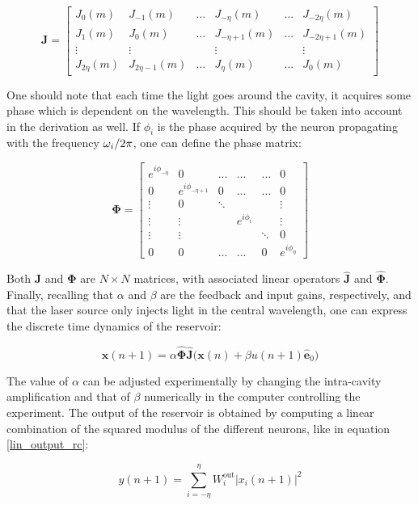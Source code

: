 \begin{equation}
	\mathbf{J} = \begin{bmatrix}
		J_0(m) & J_{-1}(m) & \dots & J_{-\eta}(m) & \dots & J_{-2\eta}(m) \\
		J_1(m) & J_0(m) & \dots & J_{-\eta+1}(m) & \dots & J_{-2\eta+1}(m) \\
		\vdots & \vdots &  & \vdots &  & \vdots \\
		J_{2\eta}(m) & J_{2\eta-1}(m) & \dots & J_\eta(m) & \dots & J_0(m)
	\end{bmatrix}
\end{equation}

One should note that each time the light goes around the cavity, it acquires some phase which is dependent on the wavelength. This should be taken into account in the derivation as well. If $\phi_i$ is the phase acquired by the neuron propagating with the frequency $\omega_i/2\pi$, one can define the phase matrix:

\begin{equation}
	\mathbf{\Phi} = \begin{bmatrix}
		e^{i\phi_{-\eta}} & 0 & \dots & \dots & \dots & 0 \\
		0 & e^{i\phi_{-\eta+1}} & 0 & \dots & \dots & 0 \\
		\vdots & 0 & \ddots & & & \vdots \\
		\vdots & \vdots & & e^{i\phi_i} & & \vdots \\
		\vdots & \vdots & & & \ddots & 0 \\
		0 & 0 & \dots & \dots & 0 & e^{i\phi_{\eta}}
	\end{bmatrix}
	\label{phase-matrix}
\end{equation}

Both $\mathbf{J}$ and $\mathbf{\Phi}$ are $N\times N$ matrices, with associated linear operators $\hat{\mathbf{J}}$ and $\hat{\mathbf{\Phi}}$. Finally, recalling that $\alpha$ and $\beta$ are the feedback and input gains, respectively, and that the laser source only injects light in the central wavelength, one can express the discrete time dynamics of the reservoir:

\begin{equation}
	\mathbf{x}(n+1) = \alpha \hat{\mathbf{\Phi}} \hat{\mathbf{J}}\bigg( \mathbf{x}(n) + \beta u(n+1) \hat{\mathbf{e}}_0\bigg)
	\label{model-reservoir}
\end{equation}

The value of $\alpha$ can be adjusted experimentally by changing the intra-cavity amplification and that of $\beta$ numerically in the computer controlling the experiment. The output of the reservoir is obtained by computing a linear combination of the squared modulus of the different neurons, like in equation \eqref{lin_output_rc}:

\begin{equation}
	y(n+1) = \sum_{i=-\eta}^\eta W_i^{\text{out}} | x_i(n+1) |^2
\end{equation}